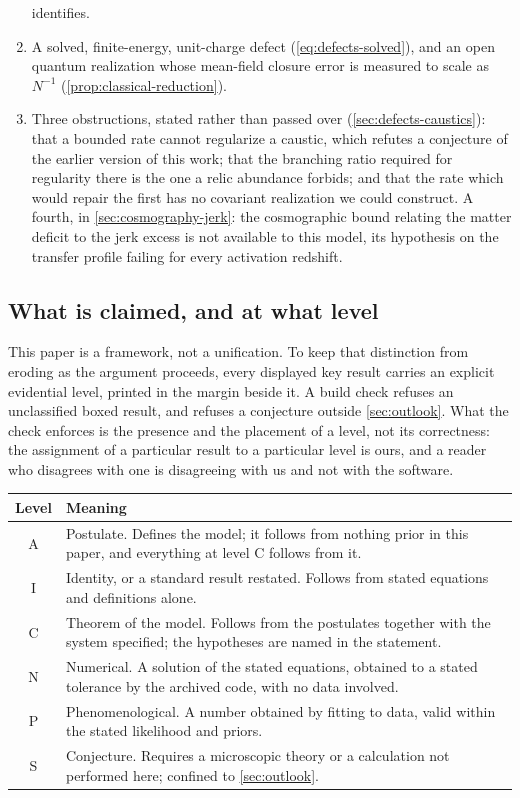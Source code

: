 \begin{enumerate}
    identifies.
  \item A solved, finite-energy, unit-charge defect
    (\cref{eq:defects-solved}), and an open quantum realization whose
    mean-field closure error is measured to scale as $N^{-1}$
    (\cref{prop:classical-reduction}).
  \item Three obstructions, stated rather than passed over
    (\cref{sec:defects-caustics}): that a bounded rate cannot regularize a
    caustic, which refutes a conjecture of the earlier version of this work;
    that the branching ratio required for regularity there is the one a relic
    abundance forbids; and that the rate which would repair the first has no
    covariant realization we could construct. A fourth, in
    \cref{sec:cosmography-jerk}: the cosmographic bound relating the matter
    deficit to the jerk excess is not available to this model, its hypothesis
    on the transfer profile failing for every activation redshift.
\end{enumerate}

\subsection{What is claimed, and at what level}\label{sec:intro-ladder}

This paper is a framework, not a unification. To keep that distinction from
eroding as the argument proceeds, every displayed key result carries an
explicit evidential level, printed in the margin beside it. A build check
refuses an unclassified boxed result, and refuses a conjecture outside
\cref{sec:outlook}. What the check enforces is the presence and the placement
of a level, not its correctness: the assignment of a particular result to a
particular level is ours, and a reader who disagrees with one is disagreeing
with us and not with the software.

\begin{center}
\begin{tabular}{cL{0.75\textwidth}}
  \toprule
  Level & Meaning \\
  \midrule
  A & Postulate. Defines the model; it follows from nothing prior in this
      paper, and everything at level C follows from it. \\
  I & Identity, or a standard result restated. Follows from stated equations
      and definitions alone. \\
  C & Theorem of the model. Follows from the postulates together with the
      system specified; the hypotheses are named in the statement. \\
  N & Numerical. A solution of the stated equations, obtained to a stated
      tolerance by the archived code, with no data involved. \\
  P & Phenomenological. A number obtained by fitting to data, valid within the
      stated likelihood and priors. \\
  S & Conjecture. Requires a microscopic theory or a calculation not performed
      here; confined to \cref{sec:outlook}. \\
  \bottomrule
\end{tabular}
\end{center}

